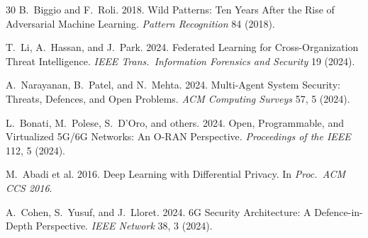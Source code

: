\documentclass[sigconf,nonacm]{acmart}
\begin{document}
\begin{thebibliography}{30}
B.~Biggio and F.~Roli. 2018. Wild Patterns: Ten Years After the
Rise of Adversarial Machine Learning. \textit{Pattern Recognition}
84 (2018).

T.~Li, A.~Hassan, and J.~Park. 2024. Federated Learning for
Cross-Organization Threat Intelligence. \textit{IEEE Trans.\
Information Forensics and Security} 19 (2024).

A.~Narayanan, B.~Patel, and N.~Mehta. 2024. Multi-Agent System
Security: Threats, Defences, and Open Problems.
\textit{ACM Computing Surveys} 57, 5 (2024).

L.~Bonati, M.~Polese, S.~D'Oro, and others. 2024. Open,
Programmable, and Virtualized 5G/6G Networks: An O-RAN Perspective.
\textit{Proceedings of the IEEE} 112, 5 (2024).

M.~Abadi et al. 2016. Deep Learning with Differential Privacy.
In \textit{Proc.\ ACM CCS 2016}.

A.~Cohen, S.~Yusuf, and J.~Lloret. 2024. 6G Security Architecture:
A Defence-in-Depth Perspective. \textit{IEEE Network} 38, 3 (2024).

\end{thebibliography}
\end{document}
